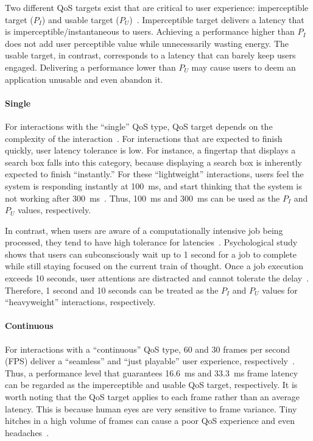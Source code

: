 Two different QoS targets exist that are critical to user experience: imperceptible target ($P_I$) and usable target ($P_U$)~\cite{ebs}. Imperceptible target delivers a latency that is imperceptible/instantaneous to users. Achieving a performance higher than $P_I$ does not add user perceptible value while unnecessarily wasting energy. The usable target, in contrast, corresponds to a latency that can barely keep users engaged. Delivering a performance lower than $P_U$ may cause users to deem an application unusable and even abandon it.

\paragraph{Single} For interactions with the ``single'' QoS type, QoS target depends on the complexity of the interaction~\cite{eventlatency}. For interactions that are expected to finish quickly, user latency tolerance is low. For instance, a fingertap that displays a search box falls into this category, because displaying a search box is inherently expected to finish ``instantly.'' For these ``lightweight'' interactions, users feel the system is responding instantly at 100~ms, and start thinking that the system is not working after 300~ms~\cite{humanperception}. Thus, 100~ms and 300~ms can be used as the $P_I$ and $P_U$ values, respectively.

In contrast, when users are aware of a computationally intensive job being processed, they tend to have high tolerance for latencies~\cite{usability_engineering}. Psychological study shows that users can subconsciously wait up to 1 second for a job to complete while still staying focused on the current train of thought. Once a job execution exceeds 10 seconds, user attentions are distracted and cannot tolerate the delay~\cite{info_vis,response_time}. Therefore, 1 second and 10 seconds can be treated as the $P_I$ and $P_U$ values for ``heavyweight'' interactions, respectively.

\paragraph{Continuous} For interactions with a ``continuous'' QoS type, 60 and 30 frames per second (FPS) deliver a ``seamless'' and ``just playable'' user experience, respectively~\cite{fps_target}. Thus, a performance level that guarantees 16.6~ms and 33.3~ms frame latency can be regarded as the imperceptible and usable QoS target, respectively. It is worth noting that the QoS target applies to each frame rather than an average latency. This is because human eyes are very sensitive to frame variance. Tiny hitches in a high volume of frames can cause a poor QoS experience and even headaches~\cite{jankbusting,adaptivevsync}.

